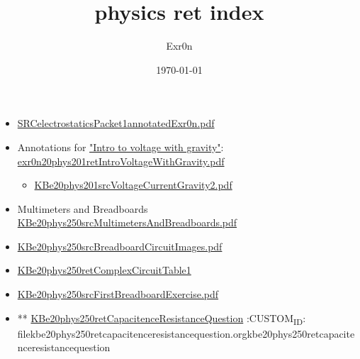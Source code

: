 \documentclass[letterpaper]{article}
\author{Exr0n}
\date{\today}
\title{physics ret index}
\renewcommand\maketitle{}
\begin{document}
\maketitle
\begin{itemize}
\item \href{SRCelectrostaticsPacket1annotatedExr0n.pdf.org}{SRCelectrostaticsPacket1annotatedExr0n.pdf}

\item Annotations for
\href{https://nuevaschool.instructure.com/courses/2851/assignments/51288}{"Intro
to voltage with gravity"}:
\href{exr0n20phys201retIntroVoltageWithGravity.pdf.org}{exr0n20phys201retIntroVoltageWithGravity.pdf}

\begin{itemize}
\item \href{KBe20phys201srcVoltageCurrentGravity2.pdf.org}{KBe20phys201srcVoltageCurrentGravity2.pdf}
\end{itemize}

\item Multimeters and Breadboards
\href{KBe20phys250srcMultimetersAndBreadboards.pdf.org}{KBe20phys250srcMultimetersAndBreadboards.pdf}

\item \href{KBe20phys250srcBreadboardCircuitImages.pdf.org}{KBe20phys250srcBreadboardCircuitImages.pdf}

\item \href{KBe20phys250retComplexCircuitTable1.org}{KBe20phys250retComplexCircuitTable1}

\item \href{KBe20phys250srcFirstBreadboardExercise.pdf.org}{KBe20phys250srcFirstBreadboardExercise.pdf}

\item ** \href{KBe20phys250retCapacitenceResistanceQuestion.org}{KBe20phys250retCapacitenceResistanceQuestion}
:CUSTOM\textsubscript{ID}: filekbe20phys250retcapacitenceresistancequestion.orgkbe20phys250retcapacitenceresistancequestion
\end{itemize}
\end{document}
